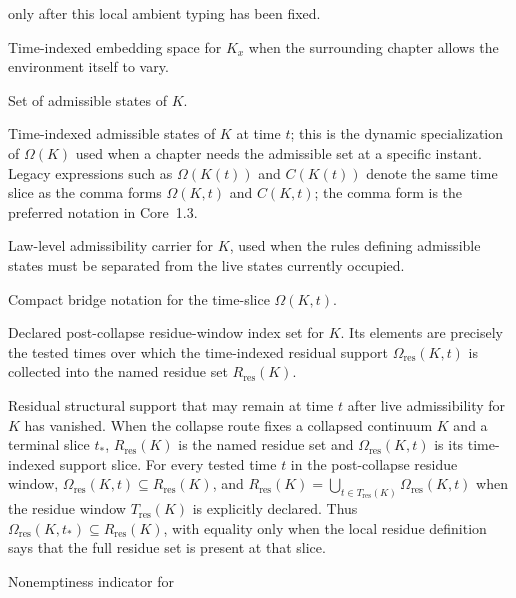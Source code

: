 \begin{description}
        only after this local ambient typing has been fixed.
  \item[\(M_x(t)\)] Time-indexed embedding space for \(K_x\) when the
        surrounding chapter allows the environment itself to vary.
  \item[\(\Omega(K)\)] Set of admissible states of \(K\).
  \item[\(\Omega(K,t)\)] Time-indexed admissible states of \(K\) at time
        \(t\); this is the dynamic specialization of \(\Omega(K)\) used when a
        chapter needs the admissible set at a specific instant.
        Legacy expressions such as \(\Omega(K(t))\) and \(C(K(t))\)
        denote the same time slice as the comma forms \(\Omega(K,t)\) and
        \(C(K,t)\); the comma form is the preferred notation in Core~1.3.
  \item[\(\Omega_{\mathrm{law}}(K)\)] Law-level admissibility carrier for
        \(K\), used when the rules defining admissible states must be separated
        from the live states currently occupied.
  \item[\(\Omega_t(K)\)] Compact bridge notation for the time-slice
        \(\Omega(K,t)\).
  \item[\(T_{\mathrm{res}}(K)\)] Declared post-collapse residue-window index
        set for \(K\). Its elements are precisely the tested times over which
        the time-indexed residual support \(\Omega_{\mathrm{res}}(K,t)\) is
        collected into the named residue set \(R_{\mathrm{res}}(K)\).
  \item[\(\Omega_{\mathrm{res}}(K,t)\)] Residual structural support that may
        remain at time \(t\) after live admissibility for \(K\) has vanished.
        When the collapse route fixes a collapsed continuum \(K\) and a
        terminal slice \(t_\ast\), \(R_{\mathrm{res}}(K)\) is the named residue
        set and \(\Omega_{\mathrm{res}}(K,t)\) is its time-indexed support
        slice. For every tested time \(t\) in the post-collapse residue window,
        \(\Omega_{\mathrm{res}}(K,t)\subseteq R_{\mathrm{res}}(K)\), and
        \(R_{\mathrm{res}}(K)=\bigcup_{t\in T_{\mathrm{res}}(K)}
        \Omega_{\mathrm{res}}(K,t)\) when the residue window
        \(T_{\mathrm{res}}(K)\) is explicitly declared. Thus
        \(\Omega_{\mathrm{res}}(K,t_\ast)\subseteq R_{\mathrm{res}}(K)\), with
        equality only when the local residue definition says that the full
        residue set is present at that slice.
  \item[\(\mathbf{1}_{\{\Omega(K,t)\neq\emptyset\}}\)] Nonemptiness indicator for

\end{description}

